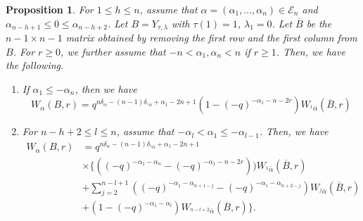 \documentclass[11pt,oneside]{amsart}
\theoremstyle{plain}
\newtheorem{proposition}[theorem]{Proposition}
\theoremstyle{definition}
\theoremstyle{remark}
\newcommand{\tx}[1]{\text{#1}}
\newcommand{\CE}{{\mathcal E}}
\numberwithin{equation}{section}
\begin{document}
	
	\begin{proposition}\label{proposition2.25}
		For $1 \leq h \leq n$, assume that $\alpha=(\alpha_1,\dots,\alpha_n) \in \CE_n$ and $\alpha_{n-h+1} \leq 0 \leq\alpha_{n-h+2}$. Let $B=Y_{\tau, \lambda}$ with $\tau(1)=1$, $\lambda_1=0$. Let $\overline{B}$ be the $n-1 \times n-1$ matrix obtained by removing the first row and the first column from $B$. For $r \geq 0$, we further assume that $-n< \alpha_1, \alpha_n <n$ if $r \geq 1$.  Then, we have the following.
		
		\begin{enumerate}
			\item If $\alpha_1 \leq -\alpha_{n}$, then we have
			\begin{equation*}
				W_{\alpha}(B,r)=q^{n\delta_{\alpha}-(n-1)\delta_{^1\overline{\alpha}}+\alpha_1-2n+1}(1-(-q)^{-\alpha_1-n-2r})W_{^1\overline{\alpha}}(\overline{B},r)
			\end{equation*}
			
			\item For $n-h+2 \leq l \leq n$, assume that $-\alpha_{l}<\alpha_1 \leq -\alpha_{l-1}$. Then, we have
			\begin{equation*}\begin{array}{ll}
					W_{\alpha}(B,r)&=q^{n\delta_{\alpha}-(n-1)\delta_{^1\overline{\alpha}}+\alpha_1-2n+1}
					\\&\times \lbrace ((-q)^{-\alpha_1-\alpha_{n}}-(-q)^{-\alpha_1-n-2r}))W_{\tx{}^1\overline{\alpha}}(\overline{B},r)\\
					& +\sum_{j=2}^{n-l+1} ((-q)^{-\alpha_1-\alpha_{n+1-j}}-(-q)^{-\alpha_1-\alpha_{n+2-j}})W_{\tx{}^j\overline{\alpha}}(\overline{B},r)\\
					&+(1-(-q)^{-\alpha_1-\alpha_l})W_{\tx{}^{n-l+2}\overline{\alpha}}(\overline{B},r)\rbrace.
				\end{array}
			\end{equation*}
		\end{enumerate} 
		
	\end{proposition}
\end{document}
